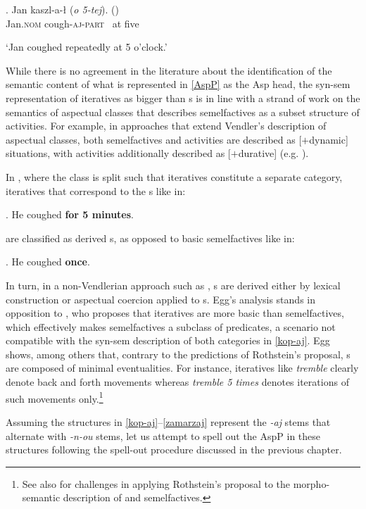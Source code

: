\exg.	Jan kaszl-a-\l  {} (\textit{o 5-tej}). \hskip 1.25cm ()\\
	Jan.\textsc{nom} cough-\textsc{aj-part} { \ at five}\\
	\strut `Jan coughed repeatedly at 5 o'clock.'

\noindent
While there is no agreement in the literature about the identification of the semantic content of what is represented in \ref{AspP} as the Asp head, the syn-sem representation of iteratives as bigger than s is in line with a strand of work on the semantics of aspectual classes that describes semelfactives as a subset structure of  activities. For example, in approaches that extend Vendler's \citeyearpar{Vendler1967} description of aspectual classes, both semelfactives and activities are described as [$+$dynamic] situations, with activities additionally described as [$+$durative] (e.g. \citealt{Smith1997,Olsen1994,Olsen1997,Beavers2008}). 
\par
In \cite{XM2004}, where the  class is split such that iteratives constitute a separate category, iteratives that correspond to the  s like in:

\ex. He coughed \textbf{for 5 minutes}.

are classified as derived s, as opposed to basic semelfactives like in:

\ex. He coughed \textbf{once}.

In turn, in a non-Vendlerian approach such as \cite{Egg2017}, s are derived either by lexical construction or aspectual coercion applied to s. Egg's \citeyearpar{Egg2017} analysis stands in opposition to \cite{rothstein2004}, who proposes that iteratives are more basic than semelfactives, which effectively makes semelfactives a subclass of  predicates, a scenario not compatible with the syn-sem description of both categories in \ref{kop-aj}. Egg shows, among others that, contrary to the predictions of Rothstein's proposal, s are composed of minimal eventualities. For instance, iteratives like \textit{tremble} clearly denote back and forth movements whereas \textit{tremble 5 times} denotes iterations of such movements only.\footnote{See also \citet[\S4.1]{NU} for challenges in applying Rothstein's proposal to the morpho-semantic description of  and  semelfactives.
}%
\par Assuming the structures in \ref{kop-aj}--\ref{zamarzaj} represent the  \textit{-aj} stems that alternate with \textit{-n-ou} stems, let us attempt to spell out the AspP in these structures following the spell-out procedure discussed in the previous chapter.

